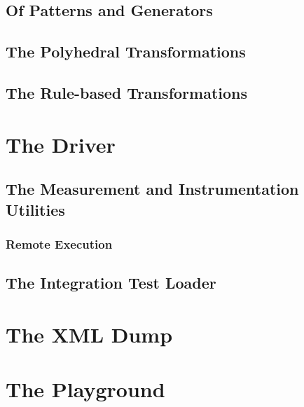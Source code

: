 \subsection{Of Patterns and Generators}
\label{sec:Compiler.Transform.Pattern}
\subsection{The Polyhedral Transformations}
\subsection{The Rule-based Transformations}



\section{The Driver} \label{sec:Driver}
\subsection{The Measurement and Instrumentation Utilities}
\label{sec:Driver.MeasureAndInstrument}
\subsubsection{Remote Execution}
\subsection{The Integration Test Loader}

\section{The XML Dump}
\section{The Playground}

